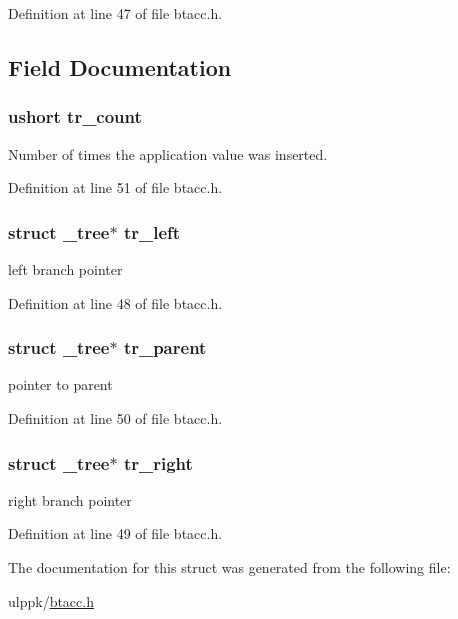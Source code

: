 Definition at line 47 of file btacc.\-h.



\subsection{Field Documentation}
\hypertarget{struct__tree_ac502c18e883004c9cd5ed0a5d32812a3}{
\subsubsection[{tr\-\_\-count}]{\setlength{\rightskip}{0pt plus 5cm}ushort tr\-\_\-count}}\label{struct__tree_ac502c18e883004c9cd5ed0a5d32812a3}


Number of times the application value was inserted. 



Definition at line 51 of file btacc.\-h.

\hypertarget{struct__tree_acbad35e3455b86aa72f2f7d69955cd4c}{
\subsubsection[{tr\-\_\-left}]{\setlength{\rightskip}{0pt plus 5cm}struct {\bf \-\_\-tree}$\ast$ tr\-\_\-left}}\label{struct__tree_acbad35e3455b86aa72f2f7d69955cd4c}


left branch pointer 



Definition at line 48 of file btacc.\-h.

\hypertarget{struct__tree_a3f0d5ba862413b2c2ea0a6859a701412}{
\subsubsection[{tr\-\_\-parent}]{\setlength{\rightskip}{0pt plus 5cm}struct {\bf \-\_\-tree}$\ast$ tr\-\_\-parent}}\label{struct__tree_a3f0d5ba862413b2c2ea0a6859a701412}


pointer to parent 



Definition at line 50 of file btacc.\-h.

\hypertarget{struct__tree_ae720de698b6a6f67364efc173bd8e32b}{
\subsubsection[{tr\-\_\-right}]{\setlength{\rightskip}{0pt plus 5cm}struct {\bf \-\_\-tree}$\ast$ tr\-\_\-right}}\label{struct__tree_ae720de698b6a6f67364efc173bd8e32b}


right branch pointer 



Definition at line 49 of file btacc.\-h.



The documentation for this struct was generated from the following file\-:\begin{DoxyCompactItemize}
\item 
ulppk/\hyperlink{btacc_8h}{btacc.\-h}\end{DoxyCompactItemize}
